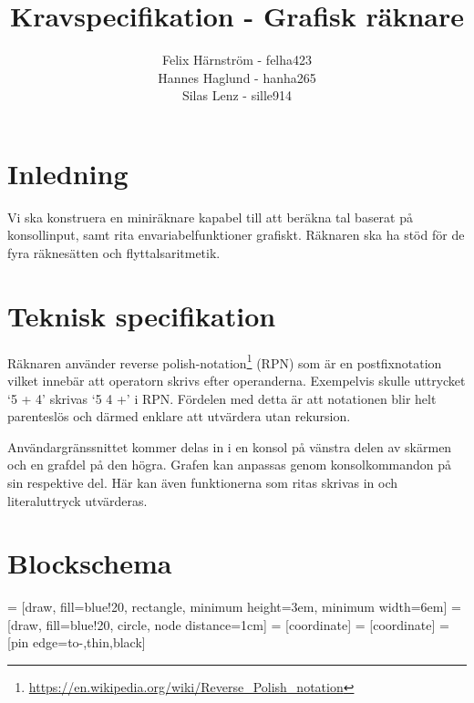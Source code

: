 \documentclass[a4paper]{article}
\title{Kravspecifikation - Grafisk räknare}
\author{Felix Härnström - felha423\\Hannes Haglund - hanha265\\Silas Lenz - sille914}
\begin{document}
\maketitle
\begin{multicols}{2}

\section*{Inledning}
Vi ska konstruera en miniräknare kapabel till att beräkna tal baserat på konsollinput, samt rita envariabelfunktioner grafiskt. Räknaren ska ha stöd för de fyra räknesätten och flyttalsaritmetik.
\section*{Teknisk specifikation}
Räknaren använder reverse polish-notation\footnote{\url{https://en.wikipedia.org/wiki/Reverse_Polish_notation}}  (RPN) som är en postfixnotation vilket innebär att operatorn skrivs efter operanderna. Exempelvis skulle uttrycket ‘5 + 4’ skrivas ‘5 4 +’ i RPN. Fördelen med detta är att notationen blir helt parenteslös och därmed enklare att utvärdera utan rekursion.

Användargränssnittet kommer delas in i en konsol på vänstra delen av skärmen och en grafdel på den högra. Grafen kan anpassas genom konsolkommandon på sin respektive del. Här kan även funktionerna som ritas skrivas in och literaluttryck utvärderas.
\section*{Blockschema}
 = [draw, fill=blue!20, rectangle, 
    minimum height=3em, minimum width=6em]
 = [draw, fill=blue!20, circle, node distance=1cm]
 = [coordinate]
 = [coordinate]
 = [pin edge={to-,thin,black}]


\end{multicols}
\end{document}
